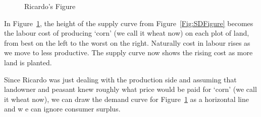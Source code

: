 \begin{figure}[htbp]
\begin{center}

\caption{Ricardo's Figure}
\label{Fig:Ricardo'sFigure}
\end{center}
\end{figure}


 In Figure~\ref{Fig:Ricardo'sFigure}, the height of the supply curve from Figure~\ref{Fig:SDFigure}   becomes the labour cost of producing  `corn' (we call it wheat now) on each plot of land, from best on the left to the worst on the right. Naturally cost in labour rises as we move to less productive. The supply curve now shows the rising cost as more land is planted.
 
 Since Ricardo was  just dealing with the production side and assuming that landowner and peasant knew roughly what  price would be paid for `corn' (we call it wheat now), we can  draw the demand curve for  Figure~\ref{Fig:Ricardo'sFigure} as a horizontal line and w e can ignore consumer surplus.

